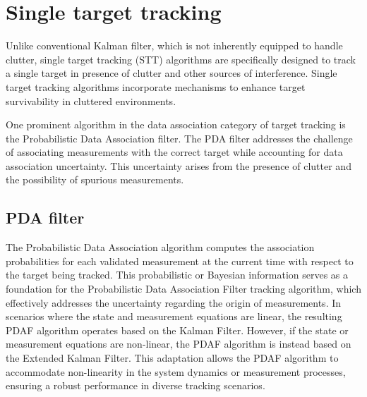\section{Single target tracking}
Unlike conventional Kalman filter, which is not inherently equipped to handle clutter, single target tracking (STT) algorithms are specifically designed to track a single target in presence of clutter and other
sources
of interference. Single target
tracking algorithms incorporate mechanisms to enhance target survivability in cluttered environments.

One prominent algorithm in the data association category of target tracking is the Probabilistic Data Association filter. The PDA filter addresses the challenge of associating measurements with the correct target while accounting for data association uncertainty. This uncertainty arises from the presence of clutter and the possibility of spurious measurements.


\subsection{PDA filter}
\label{sec:pda_filter}
The Probabilistic Data Association algorithm computes the association probabilities for each validated measurement at
the current time with respect to the target being tracked. This probabilistic or Bayesian information serves as a
foundation for the Probabilistic Data Association Filter tracking algorithm, which effectively addresses the uncertainty regarding the origin of measurements. In scenarios where the state and measurement equations are linear, the resulting PDAF algorithm operates based on the Kalman Filter. However, if the state or measurement equations are non-linear, the PDAF algorithm is instead based on the Extended Kalman Filter. This adaptation allows the PDAF algorithm to accommodate non-linearity in the system dynamics or measurement processes, ensuring a robust performance in diverse tracking scenarios.

